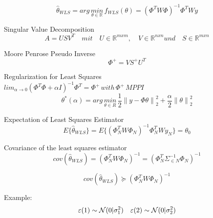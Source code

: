 \begin{equation*}
{ \hat{\theta} }_{ WLS }=arg\, \underset{ \theta \in \mathbb{R} }{ min }\,{f  }_{WLS  }(\theta)={ ({\Phi}^{T}W\Phi) }^{ -1 }{\Phi}^{T} Wy
\end{equation*}


Singular Value Decomposition
\begin{equation*}
A=US{ V }^{ T }\quad mit\quad U\in\mathbb{{R}}^{mxm}, \quad V\in\mathbb{{R}}^{nxn} und \quad S\in\mathbb{{R}}^{mxn}
\end{equation*}

Moore Penrose Pseudo Inverse
\begin{equation*}
{ \Phi  }^{ + }=V{ S }^{+}{U}^{T}
\end{equation*}

Regularization for Least Squares\\
\( { lim }_{ \alpha \rightarrow 0 }{ ({ \Phi  }^{ T }\Phi +\alpha { I }) }^{ -1 }{ \Phi  }^{ T }={ \Phi  }^{ + }\, with\,{ \Phi  }^{ + }\, MPPI \)
\begin{equation*}
{ \theta  }^{ * }(\alpha )=arg\, \underset { \theta \in { R } }{ min } \, \frac { 1 }{ 2 } {\parallel y-\Phi\theta \parallel}_{2}^{2}+\frac { \alpha }{ 2 } {\parallel \theta\parallel}_{2}^{2}
\end{equation*}

Expectation of Least Squares Estimator
\begin{equation*}
{ E }\{ { \hat { \theta  } _{ WLS } }\} { ={ E }\{ ({ \Phi  }_{ N }^{ T }W{ \Phi  }_{ N }) }^{ -1 }{ \Phi  }_{ N }^{ T }W{ y }_{ N }\} ={\theta}_{0}
\end{equation*}


Covariance of the least squares estimator
\begin{equation*}
cov({ \hat { \theta  } _{ WLS } }){ =({ \Phi  }_{ N }^{ T }W{ \Phi  }_{ N }) }^{ -1 }{ =({ \Phi  }_{ N }^{ T }{\Sigma}_{\in N }^{ -1 }{ \Phi  }_{ N }) }^{ -1 }
\end{equation*}

\begin{equation*}
cov({ \hat { \theta  } _{ WLS } }){ \succeq ({ \Phi  }_{ N }^{ T }W{ \Phi  }_{ N }) }^{ -1 }
\end{equation*}


Example:
\begin{equation*}
\varepsilon (1) \sim  { \cal{N} }(0|\sigma ^{ 2 }_{ 1 }) \quad \varepsilon (2) \sim  { \cal{N} }(0|\sigma ^{ 2 }_{ 2 })
\end{equation*}

